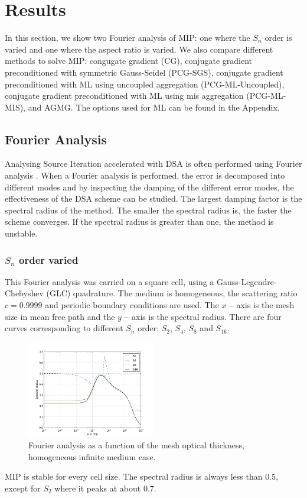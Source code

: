 \section{Results} \label{sec_res}
In this section, we show two Fourier analysis of MIP: one where the $S_n$ order is
varied and one where the aspect ratio is varied. We also compare different
methods to solve MIP: congugate gradient (CG), conjugate gradient
preconditioned with symmetric Gauss-Seidel (PCG-SGS), conjugate gradient
preconditioned with ML using uncoupled aggregation (PCG-ML-Uncoupled),
conjugate gradient preconditioned with ML using mis aggregation (PCG-ML-MIS),
and AGMG. The options used for ML can be found in the Appendix.
\subsection{Fourier Analysis}
Analysing Source Iteration accelerated with DSA is often performed using
Fourier analysis \cite{larsen_dsa,consistent_p1}. When a Fourier analysis is
performed, the error is decomposed into different modes and by inspecting the 
damping of the different error modes, the effectiveness of the DSA scheme can 
be studied. The largest damping factor is the spectral radius of the method. 
The smaller the spectral radius is, the faster the scheme converges. If the 
spectral radius is greater than one, the method is unstable. 
\subsubsection{$S_n$ order varied}
This Fourier analysis was carried on a square cell, using a
Gauss-Legendre-Chebyshev (GLC) quadrature. The medium is homogeneous, the scattering
ratio $c=0.9999$ and periodic boundary conditions are used. The $x-$axis is the mesh
size in mean free path and the $y-$axis is the spectral radius. There are four
curves corresponding to different $S_n$ order: $S_2$, $S_4$, $S_8$ and
$S_{16}$.
\begin{figure}[H]
\centering
\includegraphics[width=0.5\textwidth]{./Dsa/sn_order_9999}
\caption{Fourier analysis as a function of the mesh optical thickness,
homogeneous infinite medium case.}
\end{figure}
MIP is stable for every cell size. The spectral radius is always less than
0.5, except for $S_2$ where it peaks at about 0.7.
